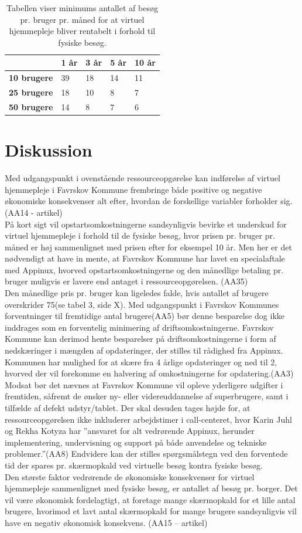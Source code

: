 \begin{table}[H]
	\caption{Tabellen viser minimums antallet af besøg pr. bruger pr. måned for at virtuel hjemmepleje bliver rentabelt i forhold til fysiske besøg.}
	\centering
	\label{tab:tabelminimum}
	\begin{tabular}{|l|l|l|l|l|}
		\hline
		 & \textbf{1 år} & \textbf{3 år} & \textbf{5 år} & \textbf{10 år}\\ \hline
		\textbf{10 brugere} & 39 & 18 & 14 & 11\\ \hline
		\textbf{25 brugere} & 18 & 10 & 8 & 7\\ \hline
		\textbf{50 brugere} & 14 & 8 & 7 & 6\\ \hline
	\end{tabular}
\end{table}
\section{Diskussion}
Med udgangspunkt i ovenstående ressourceopgørelse kan indførelse af virtuel hjemmepleje i Favrskov Kommune frembringe både positive og negative økonomiske konsekvenser alt efter, hvordan de forskellige variabler forholder sig. (AA14 - artikel)\\
På kort sigt vil opstartsomkostningerne sandsynligvis bevirke et underskud for virtuel hjemmepleje i forhold til de fysiske besøg, hvor prisen pr. bruger pr. måned er høj sammenlignet med prisen efter for eksempel 10 år. Men her er det nødvendigt at have in mente, at Favrskov Kommune har lavet en specialaftale med Appinux, hvorved opstartsomkostningerne og den månedlige betaling pr. bruger muligvis er lavere end antaget i ressourceopgørelsen. (AA35)\\
Den månedlige pris pr. bruger kan ligeledes falde, hvis antallet af brugere overskrider 75(se tabel 3, side X). Med udgangspunkt i Favrskov Kommunes forventninger til fremtidige antal brugere(AA5) bør denne besparelse dog ikke inddrages som en forventelig minimering af driftsomkostningerne. 
Favrskov Kommune kan derimod hente besparelser på driftsomkostningerne i form af nedskæringer i mængden af opdateringer, der stilles til rådighed fra Appinux. Kommunen har mulighed for at skære fra 4 årlige opdateringer og ned til 2, hvorved der vil forekomme en halvering af omkostningerne for opdatering.(AA3)
Modsat bør det nævnes at Favrskov Kommune vil opleve yderligere udgifter i fremtiden, såfremt de ønsker ny- eller videreuddannelse af superbrugere, samt i tilfælde af defekt udstyr/tablet.  
Der skal desuden tages højde for, at ressourceopgørelsen ikke inkluderer arbejdstimer i call-centeret, hvor Karin Juhl og Rekha Kotyza har ”ansvaret for alt vedrørende Appinux, herunder implementering, undervisning og support på både anvendelse og tekniske problemer.”(AA8)
Endvidere kan der stilles spørgsmålstegn ved den forventede tid der spares pr. skærmopkald ved virtuelle besøg kontra fysiske besøg.\\
Den største faktor vedrørende de økonomiske konsekvenser for virtuel hjemmepleje sammenlignet med fysiske besøg, er antallet af besøg pr. borger. Det vil være økonomisk fordelagtigt, at foretage mange skærmopkald for et lille antal brugere, hvorimod et lavt antal skærmopkald for mange brugere sandsynligvis vil have en negativ økonomisk konsekvens.
(AA15 – artikel)
